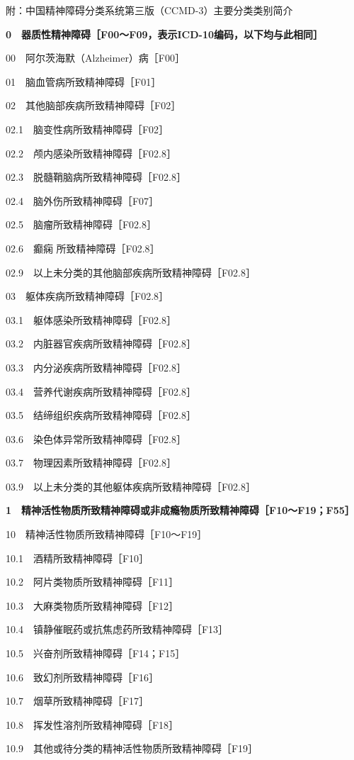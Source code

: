 附：中国精神障碍分类系统第三版（CCMD-3）主要分类类别简介

\textbf{0　器质性精神障碍［F00～F09，表示ICD-10编码，以下均与此相同］}

00　阿尔茨海默（Alzheimer）病［F00］

01　脑血管病所致精神障碍［F01］

02　其他脑部疾病所致精神障碍［F02］

02.1　脑变性病所致精神障碍［F02］

02.2　颅内感染所致精神障碍［F02.8］

02.3　脱髓鞘脑病所致精神障碍［F02.8］

02.4　脑外伤所致精神障碍［F07］

02.5　脑瘤所致精神障碍［F02.8］

02.6　癫痫 所致精神障碍［F02.8］

02.9　以上未分类的其他脑部疾病所致精神障碍［F02.8］

03　躯体疾病所致精神障碍［F02.8］

03.1　躯体感染所致精神障碍［F02.8］

03.2　内脏器官疾病所致精神障碍［F02.8］

03.3　内分泌疾病所致精神障碍［F02.8］

03.4　营养代谢疾病所致精神障碍［F02.8］

03.5　结缔组织疾病所致精神障碍［F02.8］

03.6　染色体异常所致精神障碍［F02.8］

03.7　物理因素所致精神障碍［F02.8］

03.9　以上未分类的其他躯体疾病所致精神障碍［F02.8］

\textbf{1　精神活性物质所致精神障碍或非成瘾物质所致精神障碍［F10～F19；F55］}

10　精神活性物质所致精神障碍［F10～F19］

10.1　酒精所致精神障碍［F10］

10.2　阿片类物质所致精神障碍［F11］

10.3　大麻类物质所致精神障碍［F12］

10.4　镇静催眠药或抗焦虑药所致精神障碍［F13］

10.5　兴奋剂所致精神障碍［F14；F15］

10.6　致幻剂所致精神障碍［F16］

10.7　烟草所致精神障碍［F17］

10.8　挥发性溶剂所致精神障碍［F18］

10.9　其他或待分类的精神活性物质所致精神障碍［F19］

